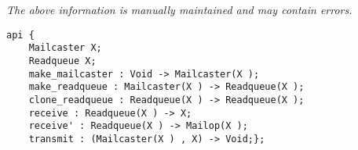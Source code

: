 \label{api:Mailcaster}

{\tiny \it The above information is manually maintained and may contain errors.}
\begin{verbatim}
api {
    Mailcaster X;
    Readqueue X;
    make_mailcaster : Void -> Mailcaster(X );
    make_readqueue : Mailcaster(X ) -> Readqueue(X );
    clone_readqueue : Readqueue(X ) -> Readqueue(X );
    receive : Readqueue(X ) -> X;
    receive' : Readqueue(X ) -> Mailop(X );
    transmit : (Mailcaster(X ) , X) -> Void;};
\end{verbatim}

